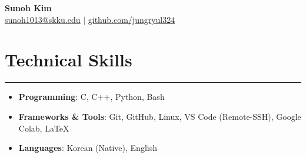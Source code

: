 \documentclass[letterpaper, 10pt]{article}
\begin{document}
\begin{center}
    \textbf{\LARGE Sunoh Kim} \\ \vspace{2pt}
    \href{mailto:sunoh1013@skku.edu}{\underline{sunoh1013@skku.edu}} $|$
    \href{https://github.com/jungryul324}{\underline{github.com/jungryul324}}
\end{center}

\section*{Technical Skills}
\hrule
\vspace{4pt}
\begin{itemize}
    \item[] \textbf{Programming}: C, C++, Python, Bash
    \item[] \textbf{Frameworks \& Tools}: Git, GitHub, Linux, VS Code (Remote-SSH), Google Colab, \LaTeX
    \item[] \textbf{Languages}: Korean (Native), English
\end{itemize}

\end{document}
